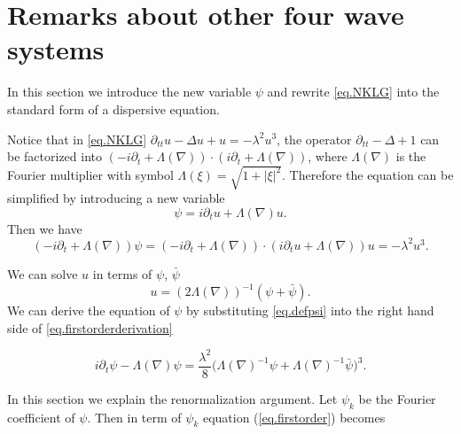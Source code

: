 \appendix

\section{Remarks about other four wave systems}\label{app.rem}


In this section we introduce the new variable $\psi$ and rewrite \eqref{eq.NKLG} into the standard form of a dispersive equation. 



Notice that in \eqref{eq.NKLG} $\partial_{tt} u - \Delta u +u = -\lambda^2 u^3$, the operator
$\partial_{tt}-\Delta +1$ can be factorized into $(-i\partial_t+\Lambda(\nabla))\cdot(i\partial_t+\Lambda(\nabla))$, where $\Lambda(\nabla)$ is the Fourier multiplier with symbol $\Lambda(\xi)=\sqrt{1+|\xi|^2}$. Therefore the equation can be simplified by introducing a new variable
\begin{equation}
    \psi=i\partial_tu+\Lambda(\nabla)u.
\end{equation}
Then we have
\begin{equation}\label{eq.firstorderderivation}
    (-i\partial_t+\Lambda(\nabla))\psi=(-i\partial_t+\Lambda(\nabla))\cdot(i\partial_tu+\Lambda(\nabla))u=-\lambda^2 u^3.
\end{equation} 

We can solve $u$ in terms of $\psi$, $\bar{\psi}$
\begin{equation}\label{eq.defpsi}
    u=(2\Lambda(\nabla))^{-1}(\psi+\bar{\psi}).
\end{equation} 
We can derive the equation of $\psi$ by substituting \eqref{eq.defpsi} into the right hand side of \eqref{eq.firstorderderivation}

\begin{equation}\label{eq.firstorder}
    i\partial_t\psi-\Lambda(\nabla)\psi=\frac{\lambda^2}{8} \Big(\Lambda(\nabla)^{-1}\psi+\Lambda(\nabla)^{-1}\bar{\psi}\Big)^3.
\end{equation} 


In this section we explain the renormalization argument.
Let $\psi_k$ be the Fourier coefficient of $\psi$. Then in term of $\psi_k$ equation (\ref{eq.firstorder}) becomes

